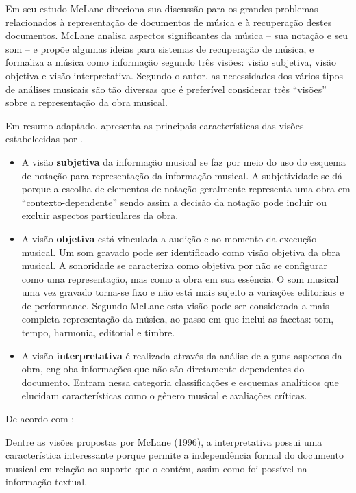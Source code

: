 Em seu estudo McLane direciona sua discussão para os grandes problemas relacionados à representação de documentos de música e à recuperação destes documentos. McLane analisa aspectos significantes da música – sua notação e seu som – e propõe algumas ideias para sistemas de recuperação de música, e formaliza a música como informação segundo três visões: visão subjetiva, visão objetiva e visão interpretativa. Segundo o autor, as necessidades dos vários tipos de análises musicais são tão diversas que é preferível considerar três “visões” sobre a representação da obra musical.

Em resumo adaptado,  apresenta as principais características das visões estabelecidas por .

\begin{itemize}
    \item A visão \textbf{subjetiva} da informação musical se faz por meio do uso do esquema de notação para representação da informação musical. A subjetividade se dá porque a escolha de elementos de notação geralmente representa uma obra em “contexto-dependente” sendo assim a decisão da notação pode incluir ou excluir aspectos particulares da obra.
    \item A visão \textbf{objetiva} está vinculada a audição e ao momento da execução musical. Um som gravado pode ser identificado como visão objetiva da obra musical. A sonoridade se caracteriza como objetiva por não se configurar como uma representação, mas como a obra em sua essência. O som musical uma vez gravado torna-se fixo e não está mais sujeito a variações editoriais e de performance. Segundo McLane esta visão pode ser considerada a mais completa representação da música, ao passo em que inclui as facetas: tom, tempo, harmonia, editorial e timbre.
    \item A visão \textbf{interpretativa} é realizada através da análise de alguns aspectos da obra, engloba informações que não são diretamente dependentes do documento. Entram nessa categoria classificações e esquemas analíticos que elucidam características como o gênero musical e avaliações críticas.
\end{itemize}

De acordo com :

\begin{citacao}
Dentre as visões propostas por McLane (1996), a interpretativa possui uma característica interessante porque permite a independência formal do documento musical em relação ao suporte que o contém, assim como foi possível na informação textual.
\end{citacao}

